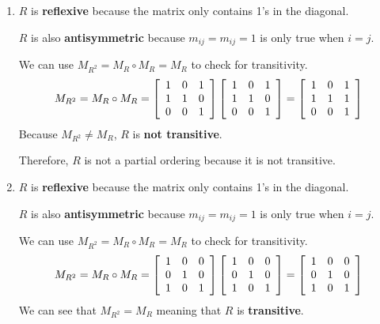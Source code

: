 \documentclass[11pt]{article}
\begin{document}
\begin{enumerate}
    \item $R$ is \textbf{reflexive} because the matrix only contains 1's in the diagonal. 
    
    $R$ is also \textbf{antisymmetric} because $m_{ij} = m_{ij} = 1$ is only true when $i = j$.
    
    We can use $M_{R^2} = M_R \circ M_R = M_R$ to check for transitivity.
    \[
    M_{R^2} = M_R \circ M_R =
    \left[
    \begin{array}{c c c}
         1 & 0 & 1 \\
         1 & 1 & 0 \\
         0 & 0 & 1
    \end{array}
    \right]
    \left[
    \begin{array}{c c c}
         1 & 0 & 1 \\
         1 & 1 & 0 \\
         0 & 0 & 1
    \end{array}
    \right]
    =
    \left[
    \begin{array}{c c c}
         1 & 0 & 1 \\
         1 & 1 & 1 \\
         0 & 0 & 1
    \end{array}
    \right]
    \]
    Because $M_{R^2} \neq M_R$, $R$ is \textbf{not transitive}.
    
    Therefore, $R$ is not a partial ordering because it is not transitive.
    
    \item $R$ is \textbf{reflexive} because the matrix only contains 1's in the diagonal. 
    
    $R$ is also \textbf{antisymmetric} because $m_{ij} = m_{ij} = 1$ is only true when $i = j$.
    
    We can use $M_{R^2} = M_R \circ M_R = M_R$ to check for transitivity.
    \[
    M_{R^2} = M_R \circ M_R =
    \left[
    \begin{array}{c c c}
         1 & 0 & 0 \\
         0 & 1 & 0 \\
         1 & 0 & 1
    \end{array}
    \right]
    \left[
    \begin{array}{c c c}
         1 & 0 & 0 \\
         0 & 1 & 0 \\
         1 & 0 & 1
    \end{array}
    \right]
    =
    \left[
    \begin{array}{c c c}
         1 & 0 & 0 \\
         0 & 1 & 0 \\
         1 & 0 & 1
    \end{array}
    \right]
    \]
    We can see that $M_{R^2} = M_R$ meaning that $R$ is \textbf{transitive}.
    

\end{enumerate}
\end{document}
